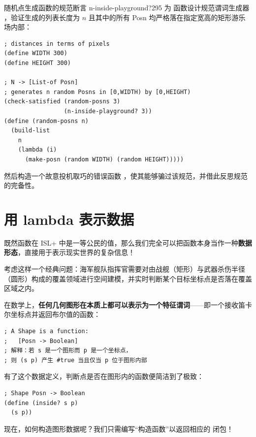 \begin{exercise}{随机点生成函数的规范断言 n-inside-playground?}{295}
为  函数设计规范谓词生成器 ，验证生成的列表长度为 $n$ 且其中的所有 Posn 均严格落在指定宽高的矩形游乐场内部：

\begin{lstlisting}[language=BSL]
; distances in terms of pixels
(define WIDTH 300)
(define HEIGHT 300)

; N -> [List-of Posn]
; generates n random Posns in [0,WIDTH) by [0,HEIGHT)
(check-satisfied (random-posns 3)
                 (n-inside-playground? 3))
(define (random-posns n)
  (build-list
    n
    (lambda (i)
      (make-posn (random WIDTH) (random HEIGHT)))))
\end{lstlisting}

然后构造一个故意投机取巧的错误函数 ，使其能够骗过该规范，并借此反思规范的完备性。
\end{exercise}

\section{用 lambda 表示数据}
\label{sec:17_5}

既然函数在 ISL+ 中是一等公民的值，那么我们完全可以把函数本身当作一种\textbf{数据形态}，直接用于表示现实世界的复杂信息！

考虑这样一个经典问题：海军舰队指挥官需要对由战舰（矩形）与武器杀伤半径（圆形）构成的覆盖领域进行空间建模，并实时判断某个目标坐标点是否落在覆盖区域之内。

在数学上，\textbf{任何几何图形在本质上都可以表示为一个特征谓词}——即一个接收笛卡尔坐标点并返回布尔值的函数：

\begin{lstlisting}[language=BSL]
; A Shape is a function:
;   [Posn -> Boolean]
; 解释：若 s 是一个图形而 p 是一个坐标点，
; 则 (s p) 产生 #true 当且仅当 p 位于图形内部
\end{lstlisting}

有了这个数据定义，判断点是否在图形内的函数便简洁到了极致：
\begin{lstlisting}[language=BSL]
; Shape Posn -> Boolean
(define (inside? s p)
  (s p))
\end{lstlisting}

现在，如何构造图形数据呢？我们只需编写“构造函数”以返回相应的  闭包！

